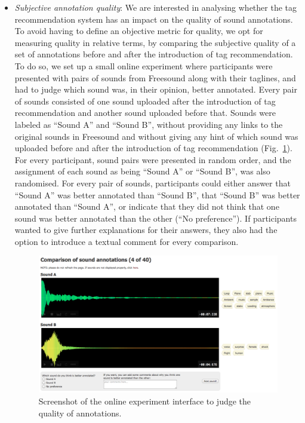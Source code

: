 \begin{itemize}
	\item \textit{Subjective annotation quality}: We are interested in analysing whether the tag recommendation system has an impact on the quality of sound annotations. To avoid having to define an objective metric for quality, we opt for measuring quality in relative terms, by comparing the subjective quality of a set of annotations before and after the introduction of tag recommendation. To do so, we set up a small online experiment where participants were presented with pairs of sounds from Freesound along with their taglines, and had to judge which sound was, in their opinion, better annotated. Every pair of sounds consisted of one sound uploaded after the introduction of tag recommendation and another sound uploaded before that. Sounds were labeled as ``Sound A'' and ``Sound B'', without providing any links to the original sounds in Freesound and without giving any hint of which sound was uploaded before and after the introduction of tag recommendation (Fig.~\ref{impact:fig:screenshot_experiment}). For every participant, sound pairs were presented in random order, and the assignment of each sound as being ``Sound A'' or ``Sound B'', was also randomised. For every pair of sounds, participants could either answer that ``Sound A'' was better annotated than ``Sound B'', that ``Sound B'' was better annotated than ``Sound A'', or indicate that they did not think that one sound was better annotated than the other (``No preference''). If participants wanted to give further explanations for their answers, they also had the option to introduce a textual comment for every comparison.
	
\begin{figure}
\centerline{\includegraphics[width=1.00\columnwidth]{ch05_impact/pics/fig03_screenshot_experiment}}
\caption[Screenshot of the online experiment interface to judge the quality of annotations]{Screenshot of the online experiment interface to judge the quality of annotations.} 
\label{impact:fig:screenshot_experiment}
\end{figure}


\end{itemize}
